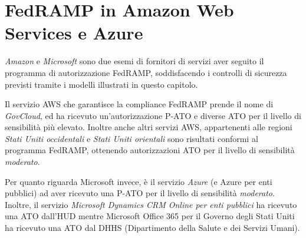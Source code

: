 \documentclass[../main.tex]{subfiles}
\begin{document}
\section{FedRAMP in Amazon Web Services e Azure}
\textit{Amazon} e \textit{Microsoft} sono due esemi di fornitori di servizi aver seguito il programma di autorizzazione FedRAMP, soddisfacendo i controlli di sicurezza previsti tramite i modelli illustrati in questo capitolo.

Il servizio AWS che garantisce la compliance FedRAMP prende il nome di \textit{GovCloud}, ed ha ricevuto un'autorizzazione P-ATO e diverse ATO per il livello di sensibilità più elevato.
Inoltre anche altri servizi AWS, appartenenti alle regioni \textit{Stati Uniti occidentali} e \textit{Stati Uniti orientali} sono risultati conformi al programma FedRAMP, ottenendo autorizzazioni ATO per il livello di sensibilità \textit{moderato}. 

Per quanto riguarda Microsoft invece, è il servizio \textit{Azure} (e Azure per enti pubblici) ad aver ricevuto una P-ATO per il livello di sensibilità \textit{moderato}.
Inoltre, il servizio \textit{Microsoft Dynamics CRM Online per enti pubblici} ha ricevuto una ATO dall'HUD mentre Microsoft Office 365 per il Governo degli Stati Uniti ha ricevuto una ATO dal DHHS (Dipartimento della Salute e dei Servizi Umani).
\end{document}
